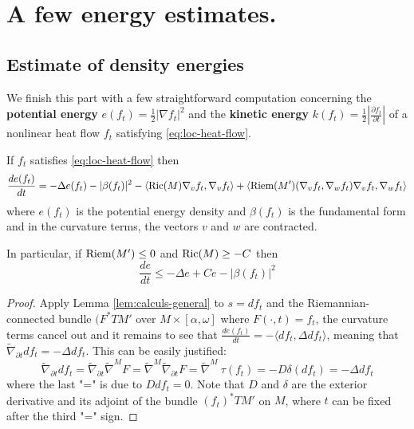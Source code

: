 \section{A few energy estimates.}
\label{sec:org08246ad}
\subsection{Estimate of density energies}
\label{sec:org77cb4c6}
We finish this part with a few straightforward computation concerning the \textbf{potential
energy} \(e(f_t) = \frac{1}{2}|\nabla f_t|^2\) and the \textbf{kinetic energy} \(k(f_t) =
\frac{1}{2}|\frac{\partial f_t}{\partial t}|\) of a nonlinear heat flow \(f_t\)
satisfying \eqref{eq:loc-heat-flow}.

\begin{theorem}
\label{thm:den-pot}
If \(f_t\) satisfies \eqref{eq:loc-heat-flow} then 
\[
 \frac{d e(f_t)}{dt}= -\Delta e(f_t) - |\beta(f_t)|^2 - \left\langle \mathop{\rm Ric}\nolimits(M) \nabla_v
f_t,\nabla_v f_t \rangle + \langle \mathop{\rm Riem}\nolimits(M') (\nabla_v f_t,\nabla_w f_t)\nabla_v
f_t,\nabla_w f_t \right\rangle
\]
where \(e(f_t)\) is the potential energy density and \(\beta(f_t)\) is the fundamental
form and in the curvature terms, the vectors \(v\) and \(w\) are contracted.

In particular, if  \(\mathop{\rm Riem}\nolimits(M') \leq 0\) and \(\mathop{\rm Ric}\nolimits(M)\geq -C\) then
\begin{equation}
\label{eq:den-pot-est}
\frac{d e}{dt} \leq -\Delta e + Ce - |\beta(f_t)|^2
\end{equation}
\end{theorem}
\begin{proof}
Apply Lemma \ref{lem:calculs-general} to \(s = d f_t\) and the Riemannian-connected
bundle \((F^* TM'\) over \(M\times [\alpha,\omega]\) where \(F(\cdot,t) = f_t\), the curvature terms cancel
out and it remains to see that
\(\frac{d e(f_t)}{dt}= - \langle df_t, \Delta df_t \rangle\), meaning that \(\tilde \nabla_{\partial t} df_t = -\Delta df_t\). This can be easily
justified:
\[
\tilde \nabla_{\partial t} df_t = \tilde \nabla_{\partial t} \tilde\nabla^M F=  \tilde\nabla^M
\tilde\nabla_{\partial t} F= \tilde\nabla^M\ \tau (f_t) = -D\delta (df_t) = -\Delta df_t
\]
where the last "=" is due to \(D df_t = 0\). Note that \(D\) and \(\delta\)
are the exterior derivative and its adjoint of the bundle \((f_t)^*TM'\) on \(M\),
where \(t\) can be fixed after the third "=" sign.
\end{proof}

